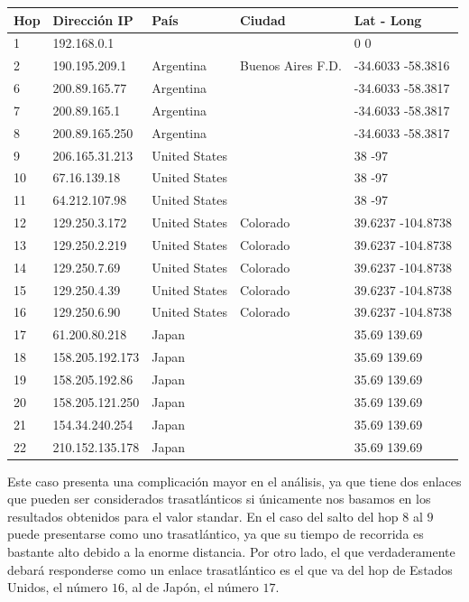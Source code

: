 \begin{center}
 \begin{tabular}{|l|l|l|l|l|}
    \hline
    Hop &Dirección IP &País &Ciudad &Lat - Long \\ \hline \hline
    1 & 192.168.0.1 &  &  & 0 0 \\ \hline
    2 & 190.195.209.1 & Argentina & Buenos Aires F.D. & -34.6033 -58.3816 \\ \hline
    6 & 200.89.165.77 & Argentina &  & -34.6033 -58.3817 \\ \hline
    7 & 200.89.165.1 & Argentina &  & -34.6033 -58.3817 \\ \hline
    8 & 200.89.165.250 & Argentina &  & -34.6033 -58.3817 \\ \hline
    9 & 206.165.31.213 & United States &  & 38 -97 \\ \hline
    10 & 67.16.139.18 & United States &  & 38 -97 \\ \hline
    11 & 64.212.107.98 & United States &  & 38 -97 \\ \hline
    12 & 129.250.3.172 & United States & Colorado & 39.6237 -104.8738 \\ \hline
    13 & 129.250.2.219 & United States & Colorado & 39.6237 -104.8738 \\ \hline
    14 & 129.250.7.69 & United States & Colorado & 39.6237 -104.8738 \\ \hline
    15 & 129.250.4.39 & United States & Colorado & 39.6237 -104.8738 \\ \hline
    16 & 129.250.6.90 & United States & Colorado & 39.6237 -104.8738 \\ \hline
    17 & 61.200.80.218 & Japan &  & 35.69 139.69 \\ \hline
    18 & 158.205.192.173 & Japan &  & 35.69 139.69 \\ \hline
    19 & 158.205.192.86 & Japan &  & 35.69 139.69 \\ \hline
    20 & 158.205.121.250 & Japan &  & 35.69 139.69 \\ \hline
    21 & 154.34.240.254 & Japan &  & 35.69 139.69 \\ \hline
    22 & 210.152.135.178 & Japan &  & 35.69 139.69 \\ \hline
 \end{tabular}
\end{center}

Este caso presenta una complicación mayor en el análisis, ya que tiene dos enlaces que pueden ser considerados trasatlánticos si únicamente nos basamos en los resultados obtenidos para el valor standar. En el caso del salto del hop $8$ al $9$ puede presentarse como uno trasatlántico, ya que su tiempo de recorrida es bastante alto debido a la enorme distancia. Por otro lado, el que verdaderamente debará responderse como un enlace trasatlántico es el que va del hop de Estados Unidos, el número $16$, al de Japón, el número $17$. 

